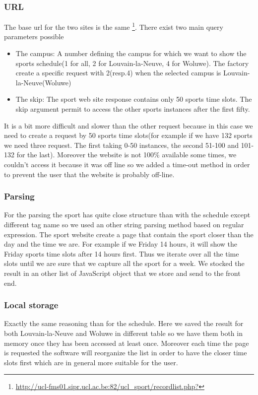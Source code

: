 \documentclass[11pt, a4paper]{report}
\begin{document}
\subsubsection{URL}
The base url for the two sites is the same \footnote{\url{http://ucl-fms01.sipr.ucl.ac.be:82/ucl_sport/recordlist.php?}}. There exist two main query parameters possible
\begin{itemize}
\item The campus: A number defining the campus for which we want to show the sports schedule(1 for all, 2 for Louvain-la-Neuve, 4 for Woluwe). The factory create a specific request with 2(resp.4) when the selected campus is Louvain-la-Neuve(Woluwe)
\item The skip: The sport web site response contains only 50 sports time slots. The skip argument permit to access the other sports instances after the first fifty.
\end{itemize}
It is a bit more difficult and slower than the other request because in this case we need to create a request by 50 sports time slots(for example if we have 132 sports we need three request. The first taking 0-50 instances, the second 51-100 and 101-132 for the last). Moreover the website is not 100\% available some times, we couldn't access it because it was off line so we added a time-out method in order to prevent the user that the website is probably off-line.
\subsubsection{Parsing}
For the parsing the sport has quite close structure than with the schedule except different tag name so we used an other string parsing method based on regular expression. The sport website create a page that contain the sport closer than the day and the time we are. For example if we Friday 14 hours, it will show the Friday sports time slots after 14 hours first. Thus we iterate over all the time slots until we are sure that we capture all the sport for a week. We stocked the result in an other list of JavaScript object that we store and send to the front end.
\subsubsection{Local storage}
Exactly the same reasoning than for the schedule. Here we saved the result for both Louvain-la-Neuve and Woluwe in different table so we have them both in memory once they has been accessed at least once. Moreover each time the page is requested the software will reorganize the list in order to have the closer time slots first which are in general more suitable for the user. 
\end{document}
